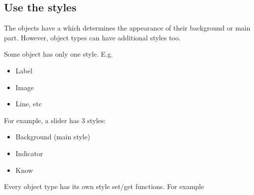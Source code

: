 \documentclass[letterpaper,10pt,english]{sphinxmanual}
\begin{document}
\begin{sphinxVerbatim}[commandchars=\\\{\}]
              
        
  
        
              

\end{sphinxVerbatim}


\subsection{Use the styles}
\label{\detokenize{overview/styles:use-the-styles}}
The objects have a  which determines the appearance of their background or main part. However, object types can have additional styles too.

Some object has only one style. E.g.
\begin{itemize}
\item {} 
Label

\item {} 
Image

\item {} 
Line, etc

\end{itemize}

For example, a slider has 3 styles:
\begin{itemize}
\item {} 
Background (main style)

\item {} 
Indicator

\item {} 
Know

\end{itemize}

Every object type has its own style set/get functions. For example

\begin{sphinxVerbatim}[commandchars=\\\{\}]
      
  
\end{sphinxVerbatim}
\end{document}
